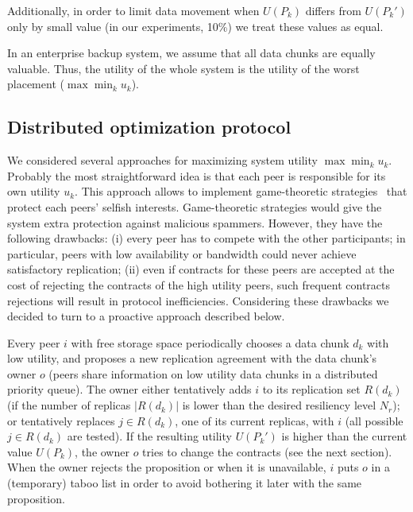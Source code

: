 \documentclass[10pt, final, conference, letterpaper]{IEEEtran}
\begin{document}
Additionally, in order to limit data movement when $U(P_k)$ differs from $U(P_k')$ only by small value (in our experiments, 10\%) we treat these values as equal.

In an enterprise backup system, we assume that all data chunks are equally valuable. Thus, the utility of the whole system is the utility of the worst placement ($\max \min_k u_k$).





\subsection{Distributed optimization protocol}

We considered several approaches for maximizing system utility $\max \min_k u_k$. Probably the most straightforward idea is that each peer is responsible for its own utility $u_k$. This approach allows to implement game-theoretic strategies~\cite{Rzadca2010ReplicaPlacementin, cox2003samsara} that protect each peers' selfish interests. Game-theoretic strategies would give the system extra protection against malicious spammers. However, they have the following drawbacks: (i) every peer has to compete with the other participants; in particular, peers with low availability or bandwidth could never achieve satisfactory replication; (ii) even if contracts for these  peers are accepted at the cost of rejecting the contracts of the high utility peers, such frequent contracts rejections will result in protocol inefficiencies. Considering these drawbacks we decided to turn to a proactive approach described below.

Every peer $i$ with free storage space periodically chooses a data chunk $d_k$ with low utility, and proposes a new replication agreement with the data chunk's owner $o$ (peers share information on low utility data chunks in a distributed priority queue).
The owner either tentatively adds $i$ to its replication set $R(d_k)$ (if the number of replicas $|R(d_k)|$ is lower than the desired resiliency level $N_r$); or tentatively replaces $j \in R(d_k)$, one of its current replicas, with $i$ (all possible $j \in R(d_k)$ are tested). If the resulting utility $U(P_k')$ is higher than the current value $U(P_k)$, the owner $o$ tries to change the contracts (see the next section). When the owner rejects the proposition or when it is unavailable, $i$ puts $o$ in a (temporary)  taboo list in order to avoid bothering it later with the same proposition. 
\end{document}
